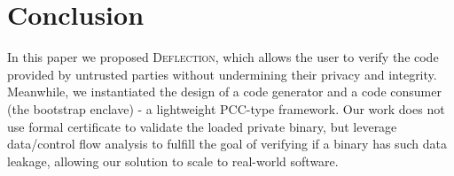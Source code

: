 \section{Conclusion}\label{sec-conclusion}

In this paper we proposed \textsc{Deflection}, which allows the user to verify the code provided by untrusted parties without undermining their privacy and integrity. Meanwhile, we instantiated the design of a code generator and a code consumer (the bootstrap enclave) - a lightweight PCC-type framework.
\DIFdelbegin {}\DIFdelend %
Our work does not use formal certificate to validate the loaded private binary, but leverage data/control flow analysis to fulfill the goal of verifying if a binary has such data leakage, allowing our solution to scale to real-world software. 





